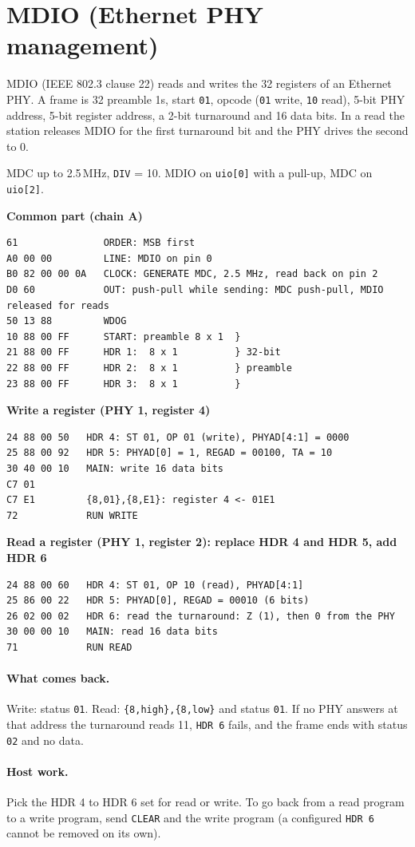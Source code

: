 \documentclass[11pt,a4paper]{article}
\newcommand{\sig}[1]{\texttt{#1}}
\newcommand{\progtitle}[1]{\par\smallskip\textbf{\small\color{accent}#1}\par\nopagebreak}
\newcommand{\facts}[1]{\par\noindent\colorbox{codebg}{\parbox{\dimexpr\linewidth-2\fboxsep}{\small #1}}\par}
\begin{document}
\section{MDIO (Ethernet PHY management)}
MDIO (IEEE 802.3 clause 22) reads and writes the 32 registers of an Ethernet PHY. A frame is 32 preamble 1s, start \texttt{01}, opcode (\texttt{01} write, \texttt{10} read), 5-bit PHY address, 5-bit register address, a 2-bit turnaround and 16 data bits. In a read the station releases MDIO for the first turnaround bit and the PHY drives the second to 0.
\facts{MDC up to 2.5\,MHz, \sig{DIV} = 10. MDIO on \sig{uio[0]} with a pull-up, MDC on \sig{uio[2]}.}
\progtitle{Common part (chain A)}
\begin{lstlisting}
61               ORDER: MSB first
A0 00 00         LINE: MDIO on pin 0
B0 82 00 00 0A   CLOCK: GENERATE MDC, 2.5 MHz, read back on pin 2
D0 60            OUT: push-pull while sending: MDC push-pull, MDIO released for reads
50 13 88         WDOG
10 88 00 FF      START: preamble 8 x 1  }
21 88 00 FF      HDR 1:  8 x 1          } 32-bit
22 88 00 FF      HDR 2:  8 x 1          } preamble
23 88 00 FF      HDR 3:  8 x 1          }
\end{lstlisting}
\progtitle{Write a register (PHY 1, register 4)}
\begin{lstlisting}
24 88 00 50   HDR 4: ST 01, OP 01 (write), PHYAD[4:1] = 0000
25 88 00 92   HDR 5: PHYAD[0] = 1, REGAD = 00100, TA = 10
30 40 00 10   MAIN: write 16 data bits
C7 01         
C7 E1         {8,01},{8,E1}: register 4 <- 01E1
72            RUN WRITE
\end{lstlisting}
\progtitle{Read a register (PHY 1, register 2): replace HDR 4 and HDR 5, add HDR 6}
\begin{lstlisting}
24 88 00 60   HDR 4: ST 01, OP 10 (read), PHYAD[4:1]
25 86 00 22   HDR 5: PHYAD[0], REGAD = 00010 (6 bits)
26 02 00 02   HDR 6: read the turnaround: Z (1), then 0 from the PHY
30 00 00 10   MAIN: read 16 data bits
71            RUN READ
\end{lstlisting}
\paragraph{What comes back.} Write: status \texttt{01}. Read: \texttt{\{8,high\},\{8,low\}} and status \texttt{01}. If no PHY answers at that address the turnaround reads 11, \sig{HDR 6} fails, and the frame ends with status \texttt{02} and no data.

\paragraph{Host work.} Pick the HDR 4 to HDR 6 set for read or write. To go back from a read program to a write program, send \sig{CLEAR} and the write program (a configured \sig{HDR 6} cannot be removed on its own).
\end{document}
